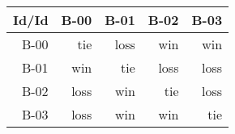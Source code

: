 \begin{tabular}{ | r | r | r | r | r | }
    \hline
        Id/Id  &   B-00  &   B-01  &   B-02  &   B-03  \\
    \hline
    \hline
         B-00  &    tie  &   loss  &    win  &    win  \\
    \hline
         B-01  &    win  &    tie  &   loss  &   loss  \\
    \hline
         B-02  &   loss  &    win  &    tie  &   loss  \\
    \hline
         B-03  &   loss  &    win  &    win  &    tie  \\
    \hline
\end{tabular}

